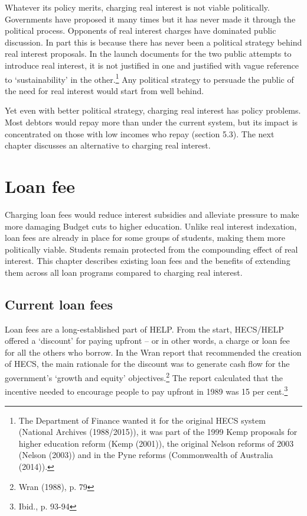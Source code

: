 \documentclass[]{book}
\begin{document}
Whatever its policy merits, charging real interest is not viable politically. Governments have proposed it many times but it has never made it through the political process. Opponents of real interest charges have dominated public discussion. In part this is because there has never been a political strategy behind real interest proposals. In the launch documents for the two public attempts to introduce real interest, it is not justified in one and justified with vague reference to `sustainability' in the other.\footnote{The Department of Finance wanted it for the original HECS system (National Archives (1988/2015)), it was part of the 1999 Kemp proposals for higher education reform (Kemp (2001)), the original Nelson reforms of 2003 (Nelson (2003)) and in the Pyne reforms (Commonwealth of Australia (2014)).} Any political strategy to persuade the public of the need for real interest would start from well behind.

Yet even with better political strategy, charging real interest has policy problems. Most debtors would repay more than under the current system, but its impact is concentrated on those with low incomes who repay (section 5.3). The next chapter discusses an alternative to charging real interest.

\chapter{\texorpdfstring{\protect\hypertarget{_Ref333241693}{}{\protect\hypertarget{_Toc341784485}{}{}}Loan fee}{Loan fee}}\label{loan-fee}

Charging loan fees would reduce interest subsidies and alleviate pressure to make more damaging Budget cuts to higher education. Unlike real interest indexation, loan fees are already in place for some groups of students, making them more politically viable. Students remain protected from the compounding effect of real interest. This chapter describes existing loan fees and the benefits of extending them across all loan programs compared to charging real interest.

\section{Current loan fees}\label{current-loan-fees}

Loan fees are a long-established part of HELP. From the start, HECS/HELP offered a `discount' for paying upfront -- or in other words, a charge or loan fee for all the others who borrow. In the Wran report that recommended the creation of HECS, the main rationale for the discount was to generate cash flow for the government's `growth and equity' objectives.\footnote{Wran (1988), p. 79} The report calculated that the incentive needed to encourage people to pay upfront in 1989 was 15 per cent.\footnote{Ibid., p. 93-94}
\end{document}
